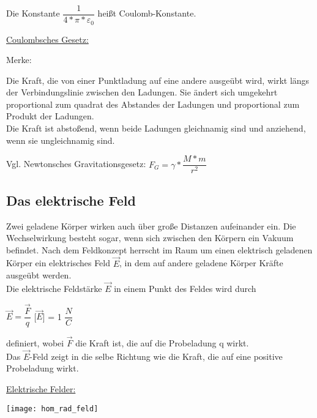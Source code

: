 \documentclass[12pt]{scrartcl}
\begin{document}
\begin{flushleft}
		\vspace{3mm}
		Die Konstante $ \dfrac{1}{4 \ast \pi \ast \varepsilon _{0} } $ heißt Coulomb-Konstante.
		
		\vspace{5mm}
		\underline{Coulombsches Gesetz:}
		
		\vspace{2mm}
		Merke:
		
		Die Kraft, die von einer Punktladung auf eine andere ausgeübt wird, wirkt längs der Verbindungslinie zwischen den Ladungen. Sie ändert sich umgekehrt proportional zum quadrat des Abstandes der Ladungen und proportional zum Produkt der Ladungen. \\
		Die Kraft ist abstoßend, wenn beide Ladungen gleichnamig sind und anziehend, wenn sie ungleichnamig sind. 
		
		\vspace{3mm}
		Vgl. Newtonsches Gravitationsgesetz: $ F_{G} = \gamma \ast \dfrac{M \ast m}{r^{2}} $
		
		\newpage
		\subsection{Das elektrische Feld}
		Zwei geladene Körper wirken auch über große Distanzen aufeinander ein. Die Wechselwirkung besteht sogar, wenn sich zwischen den Körpern ein Vakuum befindet. Nach dem Feldkonzept herrscht im Raum um einen elektrisch geladenen Körper ein elektrisches Feld $ \vec{E} $, in dem auf andere geladene Körper Kräfte ausgeübt werden. \\
		Die elektrische Feldstärke $ \vec{E} $ in einem Punkt des Feldes wird durch 
		
		\vspace{2mm}
		$ \vec{E} = \dfrac{\vec{F}}{q} $  \hspace{20mm} [$ \vec{E} $] = 1 $ \dfrac{N}{C} $
		
		\vspace{2mm}
		definiert, wobei $ \vec{F} $ die Kraft ist, die auf die Probeladung q wirkt. \\
		Das $ \vec{E} $-Feld zeigt in die selbe Richtung wie die Kraft, die auf eine positive Probeladung wirkt. 
		
		\vspace{2mm}
		\underline{Elektrische Felder:}
		\vspace{2mm}
		
		\texttt{[image: hom\_rad\_feld]}
		
		\vspace{10mm}
		

\end{flushleft}
\end{document}
